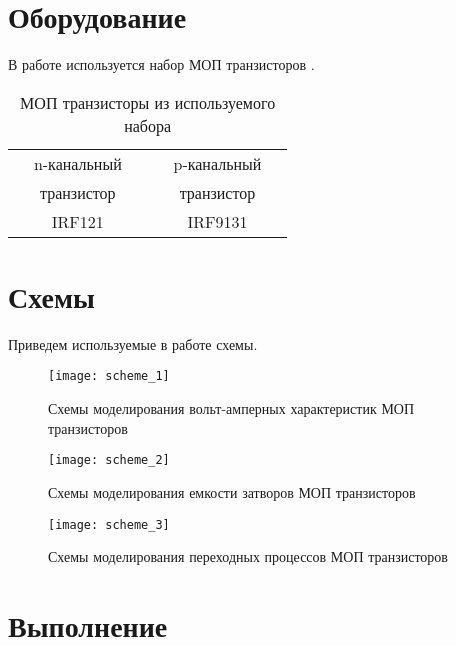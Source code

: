 \documentclass{semi}
\begin{document}

\section*{Оборудование}

В работе используется набор МОП транзисторов .

\begin{table}[H]
	\centering
	\begin{tabular}{|cc|}
		\hline
		n-канальный		&p-канальный		\\
		~~~транзистор~~~&~~~транзистор~~~	\\ \hline
		IRF121			&IRF9131			\\ \hline 
	\end{tabular}
	\caption{МОП транзисторы из используемого набора}
	\label{tab_trans}
\end{table}





\section*{Схемы}

Приведем используемые в работе схемы.

\begin{figure}[H]
	\centering
	\texttt{[image: scheme\_1]}
	\caption{Схемы моделирования вольт-амперных характеристик МОП транзисторов}
	\label{scheme_1}
\end{figure}

\begin{figure}[H]
	\centering
	\texttt{[image: scheme\_2]}
	\caption{Схемы моделирования емкости затворов МОП транзисторов}
	\label{scheme_2}
\end{figure}

\begin{figure}[H]
	\centering
	\texttt{[image: scheme\_3]}
	\caption{Схемы моделирования переходных процессов МОП транзисторов}
	\label{scheme_3}
\end{figure}


\newpage




\section*{Выполнение}
\end{document}
